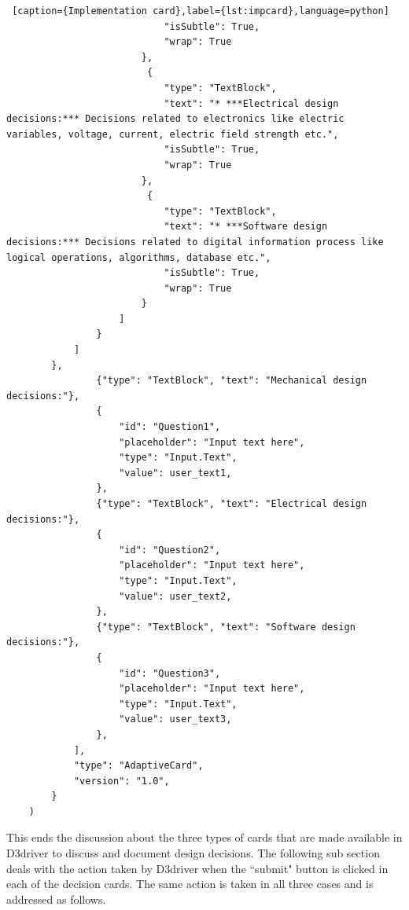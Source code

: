 \begin{lstlisting} [caption={Implementation card},label={lst:impcard},language=python]
                            "isSubtle": True,
                            "wrap": True
                        },
                         {
                            "type": "TextBlock",
                            "text": "* ***Electrical design decisions:*** Decisions related to electronics like electric variables, voltage, current, electric field strength etc.",
                            "isSubtle": True,
                            "wrap": True
                        },
                         {
                            "type": "TextBlock",
                            "text": "* ***Software design decisions:*** Decisions related to digital information process like logical operations, algorithms, database etc.",
                            "isSubtle": True,
                            "wrap": True
                        }
                    ]
                }
            ]
        },
                {"type": "TextBlock", "text": "Mechanical design decisions:"},
                {
                    "id": "Question1",
                    "placeholder": "Input text here",
                    "type": "Input.Text",
                    "value": user_text1,
                },
                {"type": "TextBlock", "text": "Electrical design decisions:"},
                {
                    "id": "Question2",
                    "placeholder": "Input text here",
                    "type": "Input.Text",
                    "value": user_text2,
                },
                {"type": "TextBlock", "text": "Software design decisions:"},
                {
                    "id": "Question3",
                    "placeholder": "Input text here",
                    "type": "Input.Text",
                    "value": user_text3,
                },  
            ],
            "type": "AdaptiveCard",
            "version": "1.0",
        }
    )
\end{lstlisting}


This ends the discussion about the three types of cards that are made available in D3driver to discuss and document design decisions. The following sub section deals with the action taken by D3driver when the ``submit" button is clicked in each of the decision cards. The same action is taken in all three cases and is addressed as follows.

